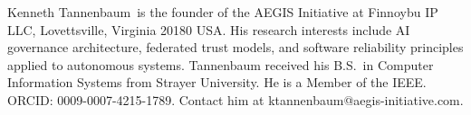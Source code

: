 \documentclass{IEEEcsmag}
\begin{document}
\begin{IEEEbiography}{Kenneth Tannenbaum}{\,}
is the founder of the AEGIS Initiative at Finnoybu IP LLC, Lovettsville, Virginia 20180 USA. His research interests include AI governance architecture, federated trust models, and software reliability principles applied to autonomous systems. Tannenbaum received his B.S.\ in Computer Information Systems from Strayer University. He is a Member of the IEEE. ORCID: 0009-0007-4215-1789. Contact him at ktannenbaum@aegis-initiative.com.
\end{IEEEbiography}
\end{document}
